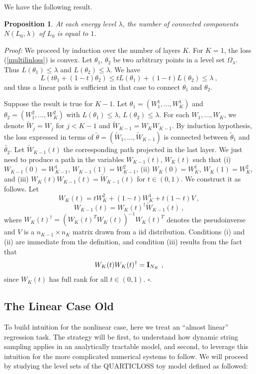 \documentclass[twocolumn,superscriptaddress,aps,prb,floatfix]{revtex4-1}
\newtheorem{proposition}[theorem]{Proposition}
\begin{document}
We have the following result.
\begin{proposition}
At each energy level $\lambda$, the number of connected components $N(L_0, \lambda)$ of $L_0$ is equal to $1$. 
\end{proposition}
{\it Proof:} We proceed by induction over the number of layers $K$. 
For $K=1$, the loss (\ref{multilinloss}) is convex. Let  $\theta_1$, $\theta_2$ be two arbitrary points 
in a level set $\Omega_\lambda$. Thus $L(\theta_1) \leq \lambda$ and $L(\theta_2) \leq \lambda$. We have
$$L( t \theta_1 + (1-t) \theta_2) \leq t L(\theta_1) + (1-t) L(\theta_2) \leq \lambda~,$$
and thus a linear path is sufficient in that case to connect $\theta_1$ and $\theta_2$.

Suppose the result is true for $K-1$. Let $\theta_1 = (W_1^1, \dots, W^1_K)$ and 
 $\theta_2 = (W_1^2, \dots, W^2_K)$ with $L(\theta_1) \leq \lambda$, $L(\theta_2) \leq \lambda$.
For each $W_1, \dots, W_K$, we denote $\tilde{W}_j = W_j$ for $j < K-1$ and
$\tilde{W}_{K-1} = W_K W_{K-1}$. By induction hypothesis, the 
loss expressed in terms of $\tilde{\theta} = (\tilde{W}_1, \dots, \tilde{W}_{K-1})$ is connected 
between $\tilde{\theta}_1$ and $\tilde{\theta_2}$. Let $\tilde{W}_{K-1}(t)$ the corresponding 
path projected in the last layer. We just need to produce a path in the variables $W_{K-1}(t)$, $W_K(t)$ 
such that (i) $W_{K-1}(0) = W_{K-1}^1$, $W_{K-1}(1) = W_{K-1}^2$, 
(ii) $W_{K}(0) = W_{K}^1$, $W_{K}(1) = W_{K}^2$, and 
(iii) $W_{K}(t) W_{K-1}(t) = \tilde{W}_{K-1}(t)$ for $t \in (0,1)$. 
We construct it as follows. Let 
$$W_{K}(t) = t W_{K}^2 + (1-t) W_{K}^1 + t (1-t) V~,$$
$$W_{K-1}(t) = W_{K}(t)^\dagger \tilde{W}_{K-1}(t)  ~,$$
where $W_{K}(t)^\dagger = ( W_{K}(t)^T W_{K}(t))^{-1} W_{K}(t)^T$ denotes the pseudoinverse 
and $V$ is a $n_{K-1} \times n_{K}$ matrix drawn from a iid distribution. 
Conditions (i) and (ii) are immediate from the definition, and condition (iii) results from the fact that 
$$W_{K}(t) W_{K}(t)^\dagger  = {\bf I}_{N_K}~,$$
since $W_K(t)$ has full rank for all $t \in (0,1)$. 
$\square$.

\subsection{The Linear Case Old}
\label{sec:LinToy}

 To build intuition for the nonlinear case, here we treat an ``almost linear'' regression task.  The strategy will be first, to understand how dynamic string sampling applies in an analytically tractable model, and second, to leverage this intuition for the more complicated numerical systems to follow.  We will proceed by studying the level sets of the \rm{QUARTICLOSS} toy model defined as followed:
 
\end{document}
